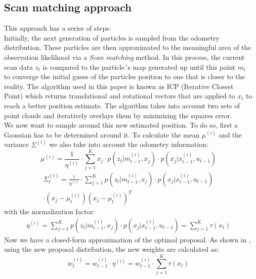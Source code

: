 \documentclass[letterpaper]{article}
\begin{document}
\subsection{Scan matching approach}
This approach has a series of steps:\\
Initially, the next generation of particles is sampled from the odometry distribution. These particles are then approximated to the meaningful area of the observation likelihood via a \textit{Scan matching} method. In this process, the current scan data $z_t$ is compared to the particle´s map generated up until this point $m_i$ to converge the initial guess of the particles position to one that is closer to the reality. The algorithm used in this paper is known as ICP (Iterative Closest Point) which returns translational and rotational vectors that are applied to $x_t$ to reach a better position estimate. The algorithm takes into account two sets of point clouds and iteratively overlays them by minimizing the squares error.\\
We now want to sample around this new estimated position. To do so, first a Gaussian has to be determined around it. To calculate the mean $\mu^{(i)}$ and the variance $\Sigma^{(i)}$ we also take into account the odometry information:
\begin{equation}
\label{mu}
\mu^{(i)}= \frac{1}{\eta^{(i)}}\cdot \sum_{j=1}^K x_j \cdot p(z_t|m_{t-1}^{(i)}, x_j) \cdot p(x_j|x_{t-1}^{(i)}, u_{t-1})
\end{equation} 
\begin{multline}
\label{sigma}
 \Sigma_t^{(i)}= \frac{1}{\eta^{(i)}}\cdot \sum_{j=1}^K p(z_t|m_{t-1}^{(i)}, x_j) \cdot p(x_j|x_{t-1}^{(i)}, u_{t-1}) \\ \cdot (x_j - \mu_t^{(i)})(x_j - \mu_t^{(i)})^T 
\end{multline} 
with the normalization factor:
\begin{multline}
\eta^{(i)}= \sum_{j=1}^K p(z_t|m_{t-1}^{(i)}, x_j) \cdot p(x_j|x_{t-1}^{(i)}, u_{t-1}) =\sum_{j=1}^K \tau (x_t)
\end{multline} 
Now we have a closed-form approximation of the optimal proposal. As shown in \cite{Cyrill}, using the new proposal distribution, the new weights are calculated as:
\begin{equation}
w_t^{(i)}=w_{t-1}^{(i)} \cdot \eta^{(i)} = w_{t-1}^{(i)} \cdot \sum_{j=1}^K \tau (x_t)
\end{equation} 
\end{document}
